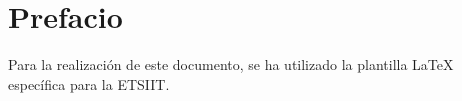 \chapter*{Prefacio}

Para la realización de este documento, se ha utilizado la plantilla \LaTeX \cite{guervos_jjplantilla-tfg-etsiit_2024} específica para la ETSIIT.